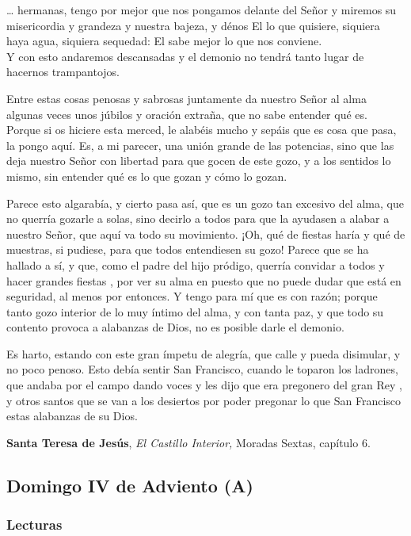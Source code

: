\documentclass[]{article}
\begin{document}
\ldots{} hermanas, tengo por mejor que nos pongamos delante del Señor y
miremos su misericordia y grandeza y nuestra bajeza, y dénos El lo que
quisiere, siquiera haya agua, siquiera sequedad: El sabe mejor lo que
nos conviene.\\
Y con esto andaremos descansadas y el demonio no tendrá tanto lugar de
hacernos trampantojos.

\protect\hypertarget{seccion10}{}{}Entre estas cosas penosas y sabrosas
juntamente da nuestro Señor al alma algunas veces unos júbilos y oración
extraña, que no sabe entender qué es.\\
Porque si os hiciere esta merced, le alabéis mucho y sepáis que es cosa
que pasa, la pongo aquí. Es, a mi parecer, una unión grande de las
potencias, sino que las deja nuestro Señor con libertad para que gocen
de este gozo, y a los sentidos lo mismo, sin entender qué es lo que
gozan y cómo lo gozan.

Parece esto algarabía, y cierto pasa así, que es un gozo tan excesivo
del alma, que no querría gozarle a solas, sino decirlo a todos para que
la ayudasen a alabar a nuestro Señor, que aquí va todo su movimiento.
¡Oh, qué de fiestas haría y qué de muestras, si pudiese, para que todos
entendiesen su gozo! Parece que se ha hallado a sí, y que, como el padre
del hijo pródigo, querría convidar a todos y hacer grandes fiestas , por
ver su alma en puesto que no puede dudar que está en seguridad, al menos
por entonces. Y tengo para mí que es con razón; porque tanto gozo
interior de lo muy íntimo del alma, y con tanta paz, y que todo su
contento provoca a alabanzas de Dios, no es posible darle el demonio.

\protect\hypertarget{seccion11}{}{}Es harto, estando con este gran
ímpetu de alegría, que calle y pueda disimular, y no poco penoso. Esto
debía sentir San Francisco, cuando le toparon los ladrones, que andaba
por el campo dando voces y les dijo que era pregonero del gran Rey , y
otros santos que se van a los desiertos por poder pregonar lo que San
Francisco estas alabanzas de su Dios.

\textbf{Santa Teresa de Jesús}, \emph{El Castillo Interior,} Moradas
Sextas, capítulo 6.

\subsection{Domingo IV de Adviento (A)}\label{domingo-iv-de-adviento-a}

\subsubsection{Lecturas}\label{lecturas-3}
\end{document}

